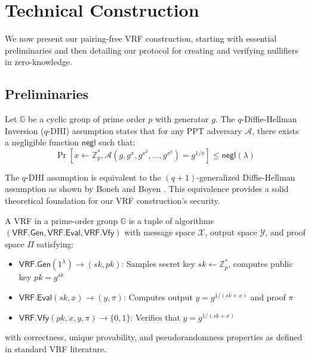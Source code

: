 \newpage
\section{Technical Construction}

We now present our pairing-free VRF construction, starting with essential preliminaries and then detailing our protocol for creating and verifying nullifiers in zero-knowledge.

\subsection{Preliminaries}

\begin{definition}
Let $\mathbb{G}$ be a cyclic group of prime order $p$ with generator $g$. The $q$-Diffie-Hellman Inversion ($q$-DHI) assumption states that for any PPT adversary $\mathcal{A}$, there exists a negligible function $\mathsf{negl}$ such that:
\[
\Pr\left[x \leftarrow \mathbb{Z}_p^*, \mathcal{A}(g, g^x, g^{x^2}, \ldots, g^{x^q}) = g^{1/x}\right] \leq \mathsf{negl}(\lambda)
\]
\end{definition}

\begin{remark}
The $q$-DHI assumption is equivalent to the $(q+1)$-generalized Diffie-Hellman assumption as shown by Boneh and Boyen \cite{BB04}. This equivalence provides a solid theoretical foundation for our VRF construction's security.
\end{remark}

\begin{definition}
A VRF in a prime-order group $\mathbb{G}$ is a tuple of algorithms $(\mathsf{VRF.Gen}, \mathsf{VRF.Eval}, \mathsf{VRF.Vfy})$ with message space $\mathcal{X}$, output space $\mathcal{Y}$, and proof space $\Pi$ satisfying:

\begin{itemize}
    \item $\mathsf{VRF.Gen}(1^\lambda) \rightarrow (sk, pk)$: Samples secret key $sk \leftarrow \mathbb{Z}_p^*$, computes public key $pk = g^{sk}$
    \item $\mathsf{VRF.Eval}(sk, x) \rightarrow (y, \pi)$: Computes output $y = g^{1/(sk+x)}$ and proof $\pi$
    \item $\mathsf{VRF.Vfy}(pk, x, y, \pi) \rightarrow \{0,1\}$: Verifies that $y = g^{1/(sk+x)}$
\end{itemize}

with correctness, unique provability, and pseudorandomness properties as defined in standard VRF literature.
\end{definition}

